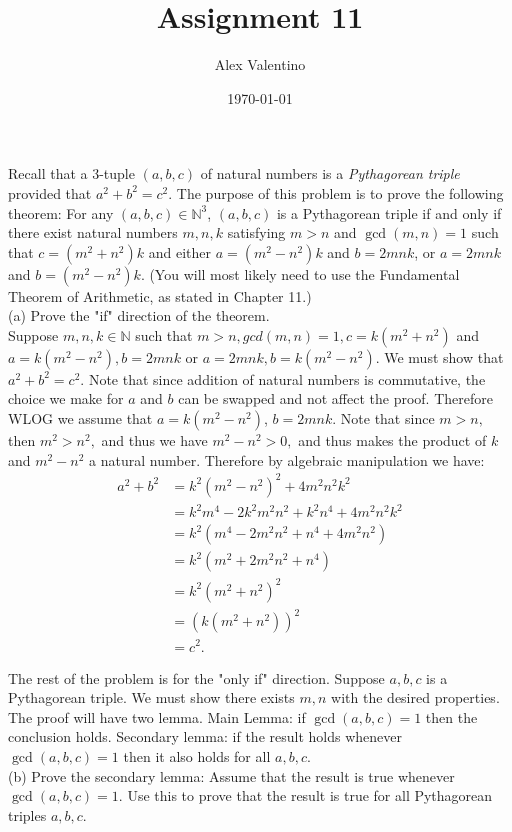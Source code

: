\documentclass[12pt, letterpaper]{article}
\date{\today}
\author{Alex Valentino}
\title{Assignment 11}
\newcommand{\N}{\mathbb{N}}
\begin{document}
Recall that a 3-tuple $(a,b,c)$ of natural numbers is a \emph{Pythagorean triple} provided that
$a^2+b^2=c^2$.   The purpose of this problem is to prove the following theorem:
For any $(a,b,c) \in \mathbb{N}^3$, $(a,b,c)$ is a Pythagorean triple if and only if there exist natural numbers $m,n,k$ satisfying $m > n$ and $\gcd(m,n)=1$ such that $c=(m^2+n^2)k$ and either $a=(m^2-n^2)k$ and $b=2mnk$,  or $a=2mnk$ and $b=(m^2-n^2)k$.  (You will  most likely need to use
the Fundamental Theorem of Arithmetic, as stated in Chapter 11.)\\



(a) Prove the "if" direction of the theorem.\\
Suppose $m,n,k \in \N$ such that $m > n, gcd(m,n) = 1, c = k(m^2 + n^2)$ and $a = k(m^2 - n^2), b = 2mnk$ or $a = 2mnk,b = k(m^2 - n^2)$.  We must show that $a^2 + b^2 = c^2.$  Note that since addition of natural numbers is commutative, the choice we make for $a$ and $b$ can be swapped and not affect the proof.    Therefore WLOG we assume that $a= k(m^2 - n^2)$, $b=2mnk.$ Note that since $m > n,$ then $m^2 > n^2,$ and thus we have $m^2 - n^2 > 0,$ and thus makes the product of $k$ and $m^2 - n^2$ a natural number.  Therefore by algebraic manipulation we have:
\begin{align*}
	a^2 + b^2 &= k^2(m^2 - n^2)^2 + 4 m^2 n^2 k^2\\
		&= k^2 m^4 - 2 k^2 m^2 n^2 + k^2 n^4 + 4 m^2 n^2 k^2 \\
		&= k^2 (m^4 - 2 m^2 n^2 + n^4 + 4 m^2 n^2)\\
		&= k^2 (m^2 + 2 m^2 n^2 + n^4)\\
		&= k^2 (m^2 + n^2)^2\\
		&= (k(m^2 + n^2))^2\\
		&= c^2.		
\end{align*}


The rest of the problem is for the "only if" direction.   Suppose $a,b,c$ is a Pythagorean triple.  We must show there exists $m,n$ with the desired properties.   The proof will have two lemma.  Main Lemma: if $\gcd(a,b,c)=1$ then the conclusion holds.  Secondary lemma: if the result holds whenever $\gcd(a,b,c)=1$ then it also holds
for all $a,b,c$.\\  


(b)  Prove the secondary lemma:
Assume that the result is true whenever $\gcd(a,b,c)=1$.  Use this to prove that
the result is true for all Pythagorean triples $a,b,c$.\\
\end{document}
